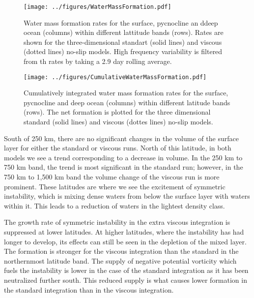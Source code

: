     \begin{figure} 
        \centering
        \texttt{[image: ../figures/WaterMassFormation.pdf]}
        \caption{Water mass formation rates for the surface, pycnocline an ddeep ocean (columns) within different lattitude bands (rows). Rates are shown for the three-dimensional standart (solid lines) and viscous (dotted lines) no-slip models. High frequency variability is filtered from th rates by taking a 2.9 day rolling average.}
        \label{fig:WaterMassFormation}
    \end{figure}

    \begin{figure} 
        \centering
        \texttt{[image: ../figures/CumulativeWaterMassFormation.pdf]}
        \caption{Cumulatively integrated water mass formation rates for the surface, pycnocline and deep ocean (columns) within different latitude bands (rows). The net formation is plotted for the three dimensional standard (solid lines) and viscous (dottes lines) no-slip models.}
        \label{fig:CumulativeWaterMassFormation}
    \end{figure}

    South of 250 km, there are no significant changes in the volume of the surface layer for either the standard or viscous runs. North of this latitude, in both models we see a trend corresponding to a decrease in volume. In the 250 km to 750 km band, the trend is most significant in the standard run; however, in the 750 km to 1,500 km band the volume change of the viscous run is more prominent. These latitudes are where we see the excitement of symmetric instability, which is mixing dense waters from below the surface layer with waters within it. This leads to a reduction of waters in the lightest density class.
    
    The growth rate of symmetric instability in the extra viscous integration is suppressed at lower latitudes. At higher latitudes, where the instability has had longer to develop, its effects can still be seen in the depletion of the mixed layer. The formation is stronger for the viscous integration than the standard in the northernmost latitude band. The supply of negative potential vorticity which fuels the instability is lower in the case of the standard integration as it has been neutralized further south. This reduced supply is what causes lower formation in the standard integration than in the viscous integration.
    
